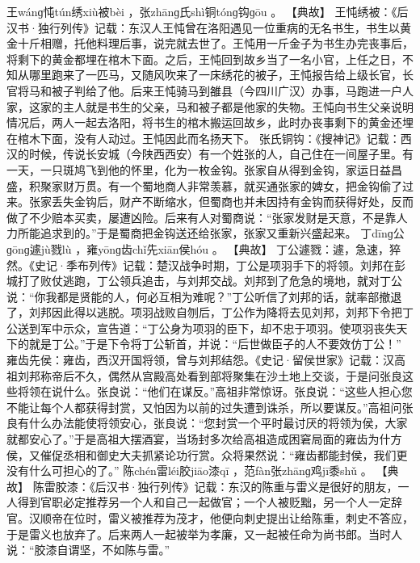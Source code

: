 \documentclass[12pt,UTF8]{ctexbook}
\begin{document}
王wánɡ忳tún绣xiù被bèi
，张zhānɡ氏shì铜tónɡ钩ɡōu
。
【典故】
王忳绣被：《后汉书·独行列传》记载：东汉人王忳曾在洛阳遇见一位重病的无名书生，书生以黄金十斤相赠，托他料理后事，说完就去世了。王忳用一斤金子为书生办完丧事后，将剩下的黄金都埋在棺木下面。之后，王忳回到故乡当了一名小官，上任之日，不知从哪里跑来了一匹马，又随风吹来了一床绣花的被子，王忳报告给上级长官，长官将马和被子判给了他。后来王忳骑马到雒县（今四川广汉）办事，马跑进一户人家，这家的主人就是书生的父亲，马和被子都是他家的失物。王忳向书生父亲说明情况后，两人一起去洛阳，将书生的棺木搬运回故乡，此时办丧事剩下的黄金还埋在棺木下面，没有人动过。王忳因此而名扬天下。
张氏铜钩：《搜神记》记载：西汉的时候，传说长安城（今陕西西安）有一个姓张的人，自己住在一间屋子里。有一天，一只斑鸠飞到他的怀里，化为一枚金钩。张家自从得到金钩，家运日益昌盛，积聚家财万贯。有一个蜀地商人非常羡慕，就买通张家的婢女，把金钩偷了过来。张家丢失金钩后，财产不断缩水，但蜀商也并未因持有金钩而获得好处，反而做了不少赔本买卖，屡遭凶险。后来有人对蜀商说：“张家发财是天意，不是靠人力所能追求到的。”于是蜀商把金钩送还给张家，张家又重新兴盛起来。
丁dīnɡ公ɡōnɡ遽jù戮lù
，雍yōnɡ齿chǐ先xiān侯hóu
。
【典故】
丁公遽戮：遽，急速，猝然。《史记·季布列传》记载：楚汉战争时期，丁公是项羽手下的将领。刘邦在彭城打了败仗逃跑，丁公领兵追击，与刘邦交战。刘邦到了危急的境地，就对丁公说：“你我都是贤能的人，何必互相为难呢？”丁公听信了刘邦的话，就率部撤退了，刘邦因此得以逃脱。项羽战败自刎后，丁公作为降将去见刘邦，刘邦下令把丁公送到军中示众，宣告道：“丁公身为项羽的臣下，却不忠于项羽。使项羽丧失天下的就是丁公。”于是下令将丁公斩首，并说：“后世做臣子的人不要效仿丁公！”
雍齿先侯：雍齿，西汉开国将领，曾与刘邦结怨。《史记·留侯世家》记载：汉高祖刘邦称帝后不久，偶然从宫殿高处看到部将聚集在沙土地上交谈，于是问张良这些将领在说什么。张良说：“他们在谋反。”高祖非常惊讶。张良说：“这些人担心您不能让每个人都获得封赏，又怕因为以前的过失遭到诛杀，所以要谋反。”高祖问张良有什么办法能使将领安心，张良说：“您封赏一个平时最讨厌的将领为侯，大家就都安心了。”于是高祖大摆酒宴，当场封多次给高祖造成困窘局面的雍齿为什方侯，又催促丞相和御史大夫抓紧论功行赏。众将果然说：“雍齿都能封侯，我们更没有什么可担心的了。”
陈chén雷léi胶jiāo漆qī
，范fàn张zhānɡ鸡jī黍shǔ
。
【典故】
陈雷胶漆：《后汉书·独行列传》记载：东汉的陈重与雷义是很好的朋友，一人得到官职必定推荐另一个人和自己一起做官；一个人被贬黜，另一个人一定辞官。汉顺帝在位时，雷义被推荐为茂才，他便向刺史提出让给陈重，刺史不答应，于是雷义也放弃了。后来两人一起被举为孝廉，又一起被任命为尚书郎。当时人说：“胶漆自谓坚，不如陈与雷。”
\end{document}
